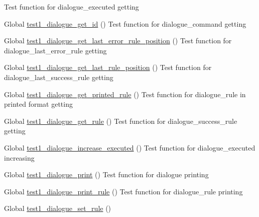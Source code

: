 \begin{DoxyRefList}
%
Test function for dialogue\+\_\+executed getting  
\item[Global \mbox{\hyperlink{dialogue__test_8c_a45e4303aefe4a7d563d44f793b1687cf}{test1\+\_\+dialogue\+\_\+get\+\_\+id}} ()]\label{test__test000031}%
%
Test function for dialogue\+\_\+command getting  
\item[Global \mbox{\hyperlink{dialogue__test_8c_aba1bf8f6dccbf79b8e686172c2cdb09a}{test1\+\_\+dialogue\+\_\+get\+\_\+last\+\_\+error\+\_\+rule\+\_\+position}} ()]\label{test__test000040}%
%
Test function for dialogue\+\_\+last\+\_\+error\+\_\+rule getting  
\item[Global \mbox{\hyperlink{dialogue__test_8c_a415cb1e519e18bea4c0c636687b5790f}{test1\+\_\+dialogue\+\_\+get\+\_\+last\+\_\+rule\+\_\+position}} ()]\label{test__test000037}%
%
Test function for dialogue\+\_\+last\+\_\+success\+\_\+rule getting  
\item[Global \mbox{\hyperlink{dialogue__test_8c_a63e6d01db1b229553dba02b3db971548}{test1\+\_\+dialogue\+\_\+get\+\_\+printed\+\_\+rule}} ()]\label{test__test000067}%
%
Test function for dialogue\+\_\+rule in printed format getting  
\item[Global \mbox{\hyperlink{dialogue__test_8c_a355f6ed374ce5e7a61ac49edbee2a1e8}{test1\+\_\+dialogue\+\_\+get\+\_\+rule}} ()]\label{test__test000043}%
%
Test function for dialogue\+\_\+success\+\_\+rule getting  
\item[Global \mbox{\hyperlink{dialogue__test_8c_a9c474fe53f306f0ff6b22910f9b74c86}{test1\+\_\+dialogue\+\_\+increase\+\_\+executed}} ()]\label{test__test000051}%
%
Test function for dialogue\+\_\+executed increasing  
\item[Global \mbox{\hyperlink{dialogue__test_8c_a2f869b9a9ae05ecf2d16134c8996659a}{test1\+\_\+dialogue\+\_\+print}} ()]\label{test__test000077}%
%
Test function for dialogue printing  
\item[Global \mbox{\hyperlink{dialogue__test_8c_a6868906aa140938351d006f8bd93606b}{test1\+\_\+dialogue\+\_\+print\+\_\+rule}} ()]\label{test__test000057}%
%
Test function for dialogue\+\_\+rule printing  
\item[Global \mbox{\hyperlink{dialogue__test_8c_aa306f88d86a668bc3967e4f8721b2dd3}{test1\+\_\+dialogue\+\_\+set\+\_\+rule}} ()]\label{test__test000033}%

\end{DoxyRefList}
